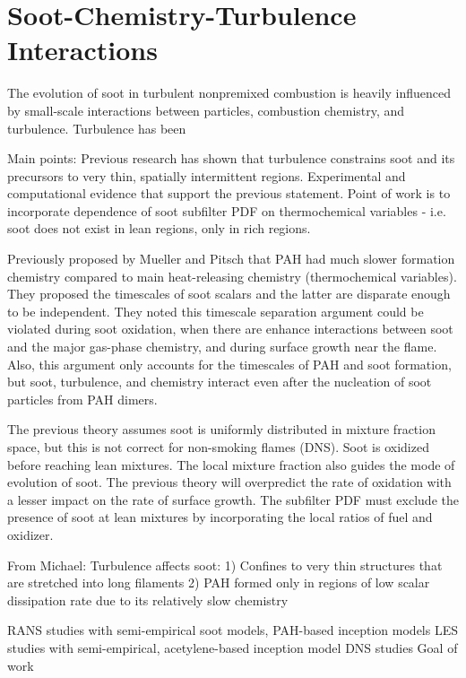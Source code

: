 \section{Soot-Chemistry-Turbulence Interactions}
\label{sec:intro:scti}

The evolution of soot in turbulent nonpremixed combustion is heavily influenced by small-scale interactions between particles, combustion chemistry, and turbulence. Turbulence has been 

Main points:
Previous research has shown that turbulence constrains soot and its precursors to very thin, spatially intermittent regions. Experimental and computational evidence that support the previous statement. Point of work is to incorporate dependence of soot subfilter PDF on thermochemical variables - i.e. soot does not exist in lean regions, only in rich regions.

Previously proposed by Mueller and Pitsch that PAH had much slower formation chemistry compared to main heat-releasing chemistry (thermochemical variables). They proposed the timescales of soot scalars and the latter are disparate enough to be independent. They noted this timescale separation argument could be violated during soot oxidation, when there are enhance interactions between soot and the major gas-phase chemistry, and during surface growth near the flame. Also, this argument only accounts for the timescales of PAH and soot formation, but soot, turbulence, and chemistry interact even after the nucleation of soot particles from PAH dimers.

The previous theory assumes soot is uniformly distributed in mixture fraction space, but this is not correct for non-smoking flames (DNS). Soot is oxidized before reaching lean mixtures. The local mixture fraction also guides the mode of evolution of soot. The previous theory will overpredict the rate of oxidation with a lesser impact on the rate of surface growth. The subfilter PDF must exclude the presence of soot at lean mixtures by incorporating the local ratios of fuel and oxidizer.

From Michael:
Turbulence affects soot:
1) Confines to very thin structures that are stretched into long filaments
2) PAH formed only in regions of low scalar dissipation rate due to its relatively slow chemistry

RANS studies with semi-empirical soot models, PAH-based inception models
LES studies with semi-empirical, acetylene-based inception model
DNS studies
Goal of work
